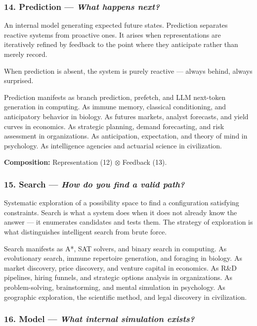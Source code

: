 \documentclass[11pt,a4paper]{article}
\newcommand{\question}[1]{\textit{#1}}
\newcommand{\comp}{\mathbin{\otimes}}
\begin{document}
\subsubsection{14. Prediction --- \question{What happens next?}}

An internal model generating expected future states. Prediction separates reactive systems from proactive ones. It arises when representations are iteratively refined by feedback to the point where they anticipate rather than merely record.

When prediction is absent, the system is purely reactive --- always behind, always surprised.

Prediction manifests as branch prediction, prefetch, and LLM next-token generation in computing. As immune memory, classical conditioning, and anticipatory behavior in biology. As futures markets, analyst forecasts, and yield curves in economics. As strategic planning, demand forecasting, and risk assessment in organizations. As anticipation, expectation, and theory of mind in psychology. As intelligence agencies and actuarial science in civilization.

\textbf{Composition:} Representation (12) $\comp$ Feedback (13).

\subsubsection{15. Search --- \question{How do you find a valid path?}}

Systematic exploration of a possibility space to find a configuration satisfying constraints. Search is what a system does when it does not already know the answer --- it enumerates candidates and tests them. The strategy of exploration is what distinguishes intelligent search from brute force.

Search manifests as A*, SAT solvers, and binary search in computing. As evolutionary search, immune repertoire generation, and foraging in biology. As market discovery, price discovery, and venture capital in economics. As R\&D pipelines, hiring funnels, and strategic options analysis in organizations. As problem-solving, brainstorming, and mental simulation in psychology. As geographic exploration, the scientific method, and legal discovery in civilization.

\subsubsection{16. Model --- \question{What internal simulation exists?}}
\end{document}
